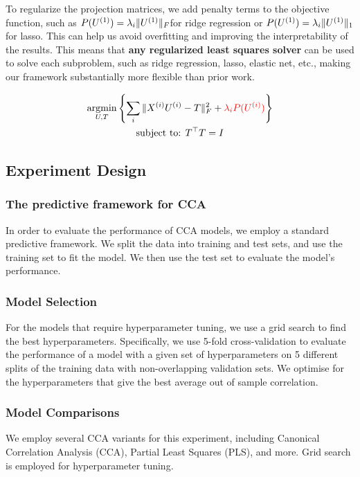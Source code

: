 To regularize the projection matrices, we add penalty terms to the objective function, such as \( P(U^{(1)}) = \lambda_i \|U^{(1)}\|_F \)for ridge regression or \( P(U^{(1)}) = \lambda_i \|U^{(1)}\|_1 \) for lasso.
This can help us avoid overfitting and improving the interpretability of the results.
This means that \textbf{any regularized least squares solver} can be used to solve each subproblem, such as ridge regression, lasso, elastic net, etc., making our framework substantially more flexible than prior work.

\begin{gather*}
    \underset{U, T}{\mathrm{argmin}}\left\{\sum_i \|X^{(i)} U^{(i)} - T\|_F^2 + \textcolor{red}{\lambda_i P(U^{(i)})}\right\}\\
    \text{subject to: }T^\top T = I\\
\end{gather*}

\subsection{Experiment Design}

\subsubsection{The predictive framework for CCA}

In order to evaluate the performance of CCA models, we employ a standard predictive framework.
We split the data into training and test sets, and use the training set to fit the model.
We then use the test set to evaluate the model's performance.

\subsubsection{Model Selection}

For the models that require hyperparameter tuning, we use a grid search to find the best hyperparameters.
Specifically, we use 5-fold cross-validation to evaluate the performance of a model with a given set of
hyperparameters on 5 different splits of the training data with non-overlapping validation sets. We optimise for the
hyperparameters that give the best average out of sample correlation.

\subsubsection{Model Comparisons}
We employ several CCA variants for this experiment, including Canonical Correlation Analysis (CCA), Partial Least Squares (PLS), and more.
Grid search is employed for hyperparameter tuning.

